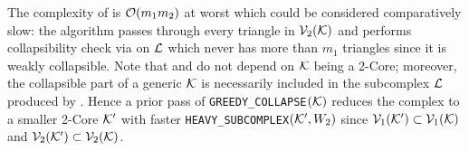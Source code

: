 The complexity of  is \( \mathcal{O}( m_1 m_2 ) \) at worst which could be considered comparatively slow: the algorithm passes through every triangle in \( \mathcal{V}_{2}(\mathcal{K}) \) and performs collapsibility check via  on \( \mathcal{L} \) which never has more than \( m_1 \) triangles since it is weakly collapsible. Note that 
  and  do not depend on \( \mathcal{K} \) being a 2-Core; moreover, the collapsible part of a generic \( \mathcal{K} \) is necessarily included in the subcomplex \( \mathcal{L} \) produced by . Hence a prior pass of \texttt{GREEDY\_COLLAPSE}\((\mathcal{K})\) reduces the complex to a smaller 2-Core \(\mathcal{K}'\) with faster \texttt{HEAVY\_SUBCOMPLEX}\((\mathcal{K}', W_2) \) since \( \mathcal{V}_1(\mathcal{K}') \subset \mathcal{V}_{1}(\mathcal{K}) \) and \( \mathcal{V}_2(\mathcal{K}') \subset \mathcal{V}_{2}(\mathcal{K}) \).

